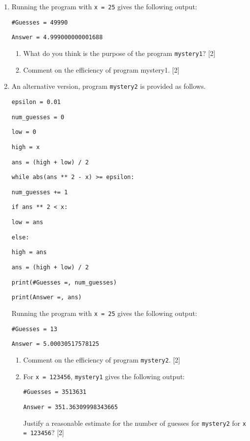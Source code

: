 \begin{enumerate}
\item Running the program with \texttt{x = 25} gives the following output: 

\noindent\begin{minipage}[t]{1\columnwidth}%
\texttt{\#Guesses = 49990 }

\texttt{Answer = 4.999000000001688}%
\end{minipage}
\begin{enumerate}
\item What do you think is the purpose of the program \texttt{mystery1}?
\hfill{} {[}2{]}
\item Comment on the efficiency of program mystery1. \hfill{}{[}2{]}
\end{enumerate}
\item An alternative version, program \texttt{mystery2} is provided as follows. 

\noindent\begin{minipage}[t]{1\columnwidth}%
\texttt{epsilon = 0.01}

\texttt{num\_guesses = 0}

\texttt{low = 0}

\texttt{high = x}

\texttt{ans = (high + low) / 2 }

\texttt{while abs(ans {*}{*} 2 - x) >= epsilon:}

\texttt{\qquad{}num\_guesses += 1 }

\texttt{\qquad{}if ans {*}{*} 2 < x: }

\texttt{\qquad{}\qquad{}low = ans }

\texttt{\qquad{}else: }

\texttt{\qquad{}\qquad{}high = ans}

\texttt{\qquad{}ans = (high + low) / 2}

\texttt{print(\textquotedbl\#Guesses =\textquotedbl , num\_guesses)}

\texttt{print(\textquotedbl Answer =\textquotedbl , ans) }%
\end{minipage}

Running the program with \texttt{x = 25} gives the following output:

\noindent\begin{minipage}[t]{1\columnwidth}%
\texttt{\#Guesses = 13 }

\texttt{Answer = 5.00030517578125 }%
\end{minipage}
\begin{enumerate}
\item Comment on the efficiency of program \texttt{mystery2}. \hfill{}{[}2{]}
\item For \texttt{x = 123456}, \texttt{mystery1} gives the following output: 

\noindent\begin{minipage}[t]{1\columnwidth}%
\texttt{\#Guesses = 3513631}

\texttt{Answer = 351.36309998343665}%
\end{minipage}

Justify a reasonable estimate for the number of guesses for \texttt{mystery2}
for \texttt{x = 123456}? \hfill{}{[}2{]}
\end{enumerate}
\end{enumerate}